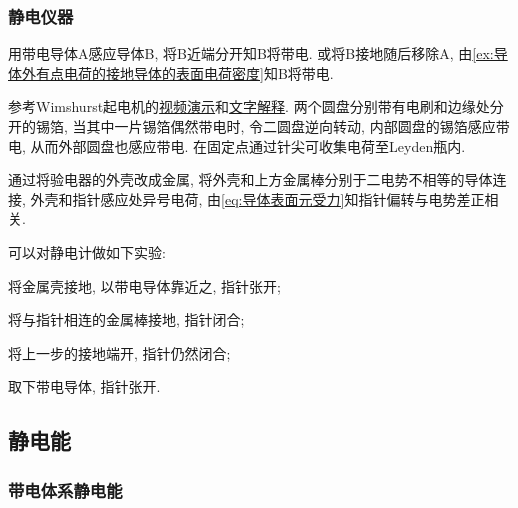 \documentclass[../Electromagnetism.tex]{subfiles}
\begin{document}

\subsubsection{静电仪器} %
\label{ssub:静电仪器}

\begin{ex}
	用带电导体A感应导体B, 将B近端分开知B将带电. 或将B接地随后移除A, 由\cref{ex:导体外有点电荷的接地导体的表面电荷密度}知B将带电.
\end{ex}
\begin{ex}
	参考Wimshurst起电机的\href{https://www.youtube.com/watch?v=Zilvl9tS0Og}{视频演示}和\href{http://phy.tw/\%E7\%A7\%91\%E5\%AD\%B8\%E5\%AF\%A6\%E9\%A9\%97/item/211-item-title}{文字解释}. 两个圆盘分别带有电刷和边缘处分开的锡箔, 当其中一片锡箔偶然带电时, 令二圆盘逆向转动, 内部圆盘的锡箔感应带电, 从而外部圆盘也感应带电. 在固定点通过针尖可收集电荷至Leyden瓶内.
\end{ex}
\begin{ex}
	通过将验电器的外壳改成金属, 将外壳和上方金属棒分别于二电势不相等的导体连接, 外壳和指针感应处异号电荷, 由\eqref{eq:导体表面元受力}知指针偏转与电势差正相关.
\end{ex}
\begin{ex}
	可以对静电计做如下实验:
	\begin{cenum}
		\item 将金属壳接地, 以带电导体靠近之, 指针张开;
		\item 将与指针相连的金属棒接地, 指针闭合;
		\item 将上一步的接地端开, 指针仍然闭合;
		\item 取下带电导体, 指针张开.
	\end{cenum}
\end{ex}



\subsection{静电能} %
\label{sub:静电能}

\subsubsection{带电体系静电能} %
\label{ssub:带电体系静电能}
\end{document}
